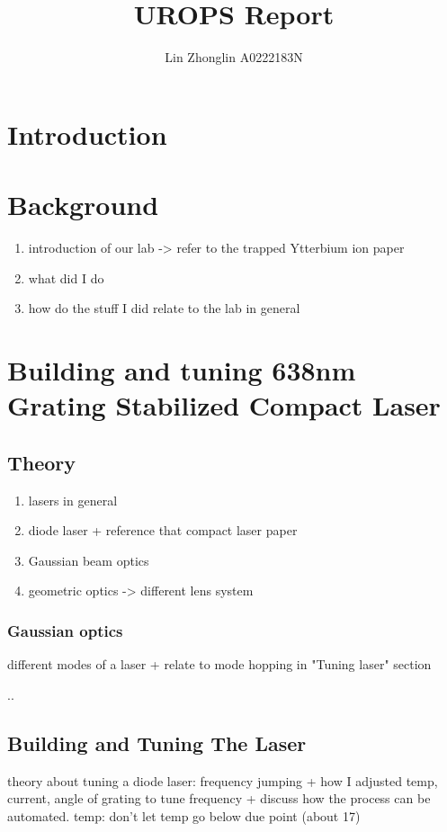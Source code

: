 \documentclass[11pt,A4Paper]{article}
\title{UROPS Report}
\author{Lin Zhonglin \hspace{1cm} A0222183N}
\begin{document}
\maketitle

\section{Introduction}


\section{Background}
\begin{enumerate}
    \item introduction of our lab -> refer to the trapped Ytterbium ion paper
    \item what did I do
    \item how do the stuff I did relate to the lab in general
\end{enumerate}

\section{Building and tuning 638nm Grating Stabilized Compact Laser}
\subsection{Theory}
\begin{enumerate}
    \item lasers in general
    \item diode laser + reference that compact laser paper
    \item Gaussian beam optics
    \item geometric optics -> different lens system 
\end{enumerate}

\subsubsection{Gaussian optics}
different modes of a laser + relate to mode hopping in "Tuning laser" section

..\subsection{Building and Tuning The Laser}
\cite{compactGratingDiodeLaser}theory about tuning a diode laser: frequency jumping + how I adjusted temp, current, angle of grating to tune frequency + discuss how the process can be automated.
temp: don't let temp go below due point (about 17) 
\end{document}

